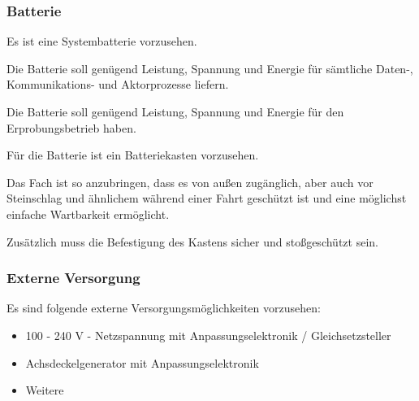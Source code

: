 \subsubsection{Batterie}
\begin{feat}
Es ist eine Systembatterie vorzusehen.
\end{feat}
\begin{rem}[zu Anf. 10]
Die Batterie soll genügend Leistung, Spannung und Energie für sämtliche Daten-, Kommunikations- und Aktorprozesse liefern.
\end{rem}
\begin{rem}[zu Anf. 10]
Die Batterie soll genügend Leistung, Spannung und Energie für den Erprobungsbetrieb haben.
\end{rem}
\begin{feat}
Für die Batterie ist ein Batteriekasten vorzusehen. 
\end{feat}
\begin{rem} [zu Anf. 11]
Das Fach ist so anzubringen, dass es von außen zugänglich, aber auch vor Steinschlag und ähnlichem während einer Fahrt geschützt ist und eine möglichst einfache Wartbarkeit ermöglicht.
\end{rem}
\begin{rem} [zu Anf. 11]
Zusätzlich muss die Befestigung des Kastens sicher und stoßgeschützt sein.
\end{rem}

\subsubsection{Externe Versorgung}
\begin{feat}
Es sind folgende externe Versorgungsmöglichkeiten vorzusehen:
\begin{itemize}
    \item 100 - 240 V - Netzspannung mit Anpassungselektronik / Gleichsetzsteller
    \item Achsdeckelgenerator mit Anpassungselektronik
    \item Weitere
\end{itemize}
\end{feat}

